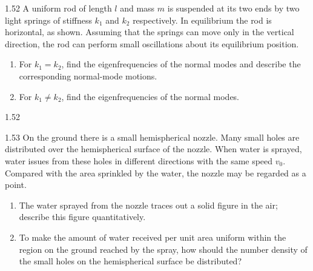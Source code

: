 \begin{problem}{1.52}
A uniform rod of length $l$ and mass $m$ is suspended at its two ends by two light springs of stiffness $k_1$ and $k_2$ respectively. In equilibrium the rod is horizontal, as shown. Assuming that the springs can move only in the vertical direction, the rod can perform small oscillations about its equilibrium position.
\begin{enumerate}[label=(\arabic*),leftmargin=2.2em,itemsep=1pt,topsep=2pt]
\item For $k_1=k_2$, find the eigenfrequencies of the normal modes and describe the corresponding normal-mode motions.
\item For $k_1\ne k_2$, find the eigenfrequencies of the normal modes.
\end{enumerate}
\end{problem}

\begin{figbox}{1.52}
\end{figbox}

\begin{problem}{1.53}
On the ground there is a small hemispherical nozzle. Many small holes are distributed over the hemispherical surface of the nozzle. When water is sprayed, water issues from these holes in different directions with the same speed $v_0$. Compared with the area sprinkled by the water, the nozzle may be regarded as a point.
\begin{enumerate}[label=(\arabic*),leftmargin=2.2em,itemsep=1pt,topsep=2pt]
\item The water sprayed from the nozzle traces out a solid figure in the air; describe this figure quantitatively.
\item To make the amount of water received per unit area uniform within the region on the ground reached by the spray, how should the number density of the small holes on the hemispherical surface be distributed?
\end{enumerate}
\end{problem}

